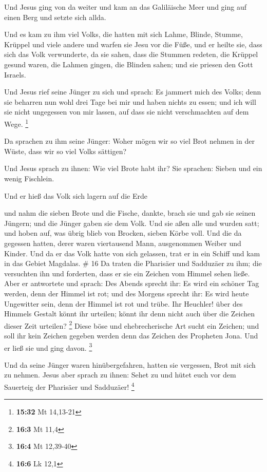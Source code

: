  Und Jesus ging von da weiter und kam an das Galiläische
Meer und ging auf einen Berg und setzte sich allda.

 Und es kam zu ihm viel Volks, die hatten mit sich Lahme,
Blinde, Stumme, Krüppel und viele andere und warfen sie Jesu vor die
Füße, und er heilte sie,  dass sich das Volk verwunderte,
da sie sahen, dass die Stummen redeten, die Krüppel gesund waren, die
Lahmen gingen, die Blinden sahen; und sie priesen den Gott Israels.

 Und Jesus rief seine Jünger zu sich und sprach: Es jammert
mich des Volks; denn sie beharren nun wohl drei Tage bei mir und haben
nichts zu essen; und ich will sie nicht ungegessen von mir lassen, auf
dass sie nicht verschmachten auf dem Wege. \footnote{\textbf{15:32} Mt
  14,13-21}

 Da sprachen zu ihm seine Jünger: Woher mögen wir so viel
Brot nehmen in der Wüste, dass wir so viel Volks sättigen?

 Und Jesus sprach zu ihnen: Wie viel Brote habt ihr? Sie
sprachen: Sieben und ein wenig Fischlein.

 Und er hieß das Volk sich lagern auf die Erde

 und nahm die sieben Brote und die Fische, dankte, brach
sie und gab sie seinen Jüngern; und die Jünger gaben sie dem Volk.
 Und sie aßen alle und wurden satt; und hoben auf, was
übrig blieb von Brocken, sieben Körbe voll.  Und die da
gegessen hatten, derer waren viertausend Mann, ausgenommen Weiber und
Kinder.  Und da er das Volk hatte von sich gelassen, trat
er in ein Schiff und kam in das Gebiet Magdalas. \# 16  Da
traten die Pharisäer und Sadduzäer zu ihm; die versuchten ihn und
forderten, dass er sie ein Zeichen vom Himmel sehen ließe. 
Aber er antwortete und sprach: Des Abends sprecht ihr: Es wird ein
schöner Tag werden, denn der Himmel ist rot;  und des
Morgens sprecht ihr: Es wird heute Ungewitter sein, denn der Himmel ist
rot und trübe. Ihr Heuchler! über des Himmels Gestalt könnt ihr
urteilen; könnt ihr denn nicht auch über die Zeichen dieser Zeit
urteilen? \footnote{\textbf{16:3} Mt 11,4}  Diese böse und
ehebrecherische Art sucht ein Zeichen; und soll ihr kein Zeichen gegeben
werden denn das Zeichen des Propheten Jona. Und er ließ sie und ging
davon. \footnote{\textbf{16:4} Mt 12,39-40}

 Und da seine Jünger waren hinübergefahren, hatten sie
vergessen, Brot mit sich zu nehmen.  Jesus aber sprach zu
ihnen: Sehet zu und hütet euch vor dem Sauerteig der Pharisäer und
Sadduzäer! \footnote{\textbf{16:6} Lk 12,1}


